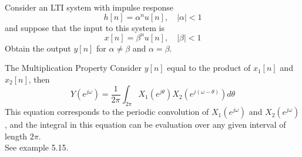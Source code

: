 \begin{frame}
    \begin{example}
        Consider an LTI system with impulse response
        \begin{equation*}
          h[n] = \alpha^n u[n], \quad |\alpha| <1
        \end{equation*}
        and suppose that the input to this system is
        \begin{equation*}
          x[n] = \beta^n u[n], \quad |\beta| <1
        \end{equation*}
        Obtain the output $y[n]$ for $\alpha \neq \beta$ and $\alpha = \beta$.
    \end{example}
\end{frame}


\begin{frame}{The Multiplication Property}
    Consider $y[n]$ equal to the product of $x_1[n]$ and $x_2[n]$, then
    \begin{equation*}
        Y(e^{j\omega}) = \frac{1}{2\pi}\int_{2\pi}X_1(e^{j\theta})X_2(e^{j(\omega - \theta)})d\theta
    \end{equation*}
    This equation corresponds to the \alert{periodic convolution} of $X_1(e^{j\omega})$ and $X_2(e^{j\omega})$, and the integral in this equation can be evaluation over any given interval of length $2\pi$.\\

    See example 5.15.
\end{frame}

